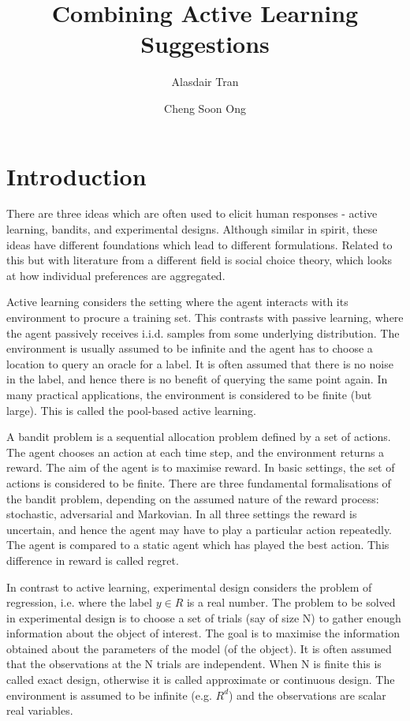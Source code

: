 \documentclass[fleqn,10pt,lineno]{wlpeerj} %
\title{Combining Active Learning Suggestions}
\author[1]{Alasdair Tran}
\author[2]{Cheng Soon Ong}
\affil[1]{}
\affil[2]{Machine Learning Research Group, Data61, CSIRO, Australia}
\begin{document}
\flushbottom
\maketitle
\thispagestyle{empty}

\section*{Introduction}

There are three ideas which are often used to elicit human responses - active
learning, bandits, and experimental designs. Although similar in spirit, these
ideas have different foundations which lead to different formulations. Related
to this but with literature from a different field is social choice theory,
which looks at how individual preferences are aggregated.

Active learning considers the setting where the agent interacts with its
environment to procure a training set. This contrasts with passive learning,
where the agent passively receives i.i.d. samples from some underlying
distribution. The environment is usually assumed to be infinite and the agent
has to choose a location to query an oracle for a label. It is often assumed
that there is no noise in the label, and hence there is no benefit of querying
the same point again. In many practical applications, the environment is
considered to be finite (but large). This is called the pool-based active
learning.

A bandit problem is a sequential allocation problem defined by a set of
actions. The agent chooses an action at each time step, and the environment
returns a reward. The aim of the agent is to maximise reward. In basic
settings, the set of actions is considered to be finite. There are three
fundamental formalisations of the bandit problem, depending on the assumed
nature of the reward process: stochastic, adversarial and Markovian. In all
three settings the reward is uncertain, and hence the agent may have to play a
particular action repeatedly. The agent is compared to a static agent which has
played the best action. This difference in reward is called regret.

In contrast to active learning, experimental design considers the problem of
regression, i.e. where the label $y\in R$ is a real number. The problem to be
solved in experimental design is to choose a set of trials (say of size N) to
gather enough information about the object of interest. The goal is to maximise
the information obtained about the parameters of the model (of the object). It
is often assumed that the observations at the N trials are independent. When N
is finite this is called exact design, otherwise it is called approximate or
continuous design. The environment is assumed to be infinite (e.g. $R^d$) and
the observations are scalar real variables.
\end{document}
